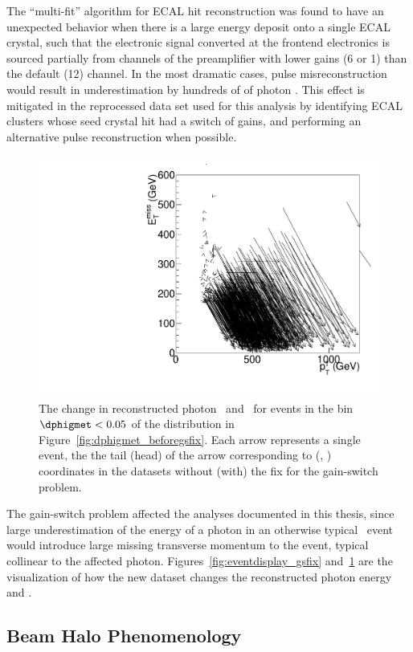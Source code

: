 The ``multi-fit'' algorithm for ECAL hit reconstruction was found to have an unexpected behavior when there is a large energy deposit onto a single ECAL crystal, such that the electronic signal converted at the frontend electronics is sourced partially from channels of the preamplifier with lower gains (6 or 1) than the default (12) channel. 
In the most dramatic cases, pulse misreconstruction would result in underestimation by hundreds of \GeV of photon \pt. 
This effect is mitigated in the reprocessed data set used for this analysis by identifying ECAL clusters whose seed crystal hit had a switch of gains, and performing an alternative pulse reconstruction when possible.

\begin{figure}[htbp]
  \centering
  \includegraphics[width=0.6\linewidth]{Reconstruction/Figures/gsfix/movements.pdf}
  \caption{
    The change in reconstructed photon \pt\ and \met\ for events in the bin $\dphigmet < 0.05$ of the distribution in Figure~\ref{fig:dphigmet_beforegsfix}. 
    Each arrow represents a single event, the the tail (head) of the arrow corresponding to (\ETg, \met) coordinates in the datasets without (with) the fix for the gain-switch problem.
  }
  \label{fig:ptshift_gsfix}
\end{figure}

The gain-switch problem affected the analyses documented in this thesis, since large underestimation of the energy of a photon in an otherwise typical \gj\ event would introduce large missing transverse momentum to the event, typical collinear to the affected photon. 
Figures~\ref{fig:eventdisplay_gsfix} and~\ref{fig:ptshift_gsfix} are the visualization of how the new dataset changes the reconstructed photon energy and \met.

\subsection{Beam Halo Phenomenology}
\label{sec:halo}

